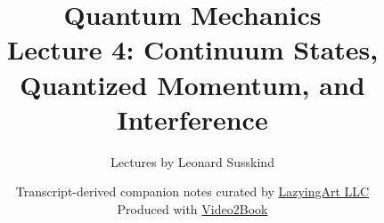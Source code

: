 \documentclass[11pt,oneside]{book}
\begin{document}
\hypersetup{pageanchor=false}
\frontmatter
\title{Quantum Mechanics\\[0.45em]
\large Lecture 4: Continuum States, Quantized Momentum, and Interference}
\author{Lectures by Leonard Susskind}
\date{Transcript-derived companion notes curated by
\href{https://lazying.art}{LazyingArt LLC}\\[0.35em]
\small Produced with
\href{https://github.com/lachlanchen/Video2Book}{Video2Book}}
\maketitle
\hypersetup{pageanchor=true}
\mainmatter

\end{document}
